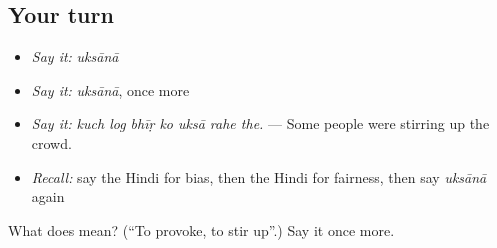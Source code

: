 \subsection*{Your turn}
\begin{itemize}
\raggedright
  \item \emph{Say it:} \emph{uksānā}
  \item \emph{Say it:} \emph{uksānā}, once more
  \item \emph{Say it:} \emph{kuch log bhīṛ ko uksā rahe the.} — Some people were stirring up the crowd.
  \item \emph{Recall:} say the Hindi for bias, then the Hindi for fairness, then say \emph{uksānā} again
\end{itemize}

\begin{tcolorbox}[breakable,colback=teal!4,colframe=teal!35!black,title={Before you move on}]
What does  mean? (\textquotedblleft{}To provoke, to stir up\textquotedblright{}.) Say it once more.
\end{tcolorbox}
